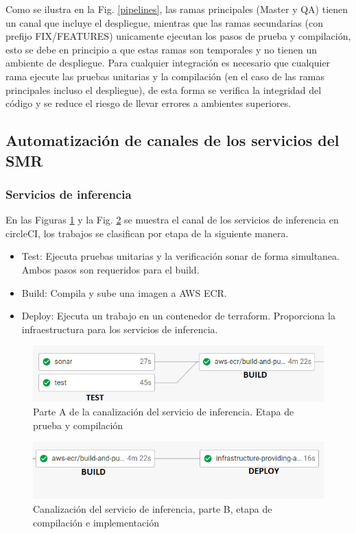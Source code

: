 Como se ilustra en la Fig. \ref{pipelines}, las ramas principales (Master y QA) tienen un canal que incluye el despliegue, mientras que las ramas secundarias (con prefijo FIX/FEATURES) unicamente ejecutan los pasos de prueba y compilación, esto se debe en principio a que estas ramas son temporales y no tienen un ambiente de despliegue. Para cualquier integración es necesario que cualquier rama ejecute las pruebas unitarias y la compilación (en el caso de las ramas principales incluso el despliegue), de esta forma se verifica la integridad del código y se reduce el riesgo de llevar errores a ambientes superiores.


\subsection {Automatización de canales de los servicios del SMR}

\subsubsection {Servicios de inferencia}

En las Figuras \ref {pipelineA} y la Fig. \ref{pipelineB} se muestra el canal de los servicios de inferencia en circleCI, los trabajos se clasifican por etapa de la siguiente manera.

\begin {itemize}
	\item Test: Ejecuta pruebas unitarias y la verificación sonar de forma simultanea. Ambos pasos son requeridos para el build.
	\item Build: Compila y sube una imagen a AWS ECR.
	\item Deploy: Ejecuta un trabajo en un contenedor de terraform. Proporciona la infraestructura para los servicios de inferencia.
\end {itemize}

\begin{figure}[H]
\centering
\includegraphics[width=0.8\linewidth]{bibliografia/Imagenes/inferencerpipelineA.PNG}
\caption {Parte A de la canalización del servicio de inferencia. Etapa de prueba y compilación}
\label {pipelineA}
\end {figure}

\begin{figure}[H]
\centering
\includegraphics[width=0.8\linewidth]{bibliografia/Imagenes/inferencerpipelineB.PNG}
\caption {Canalización del servicio de inferencia, parte B, etapa de compilación e implementación}
\label {pipelineB}
\end {figure}


